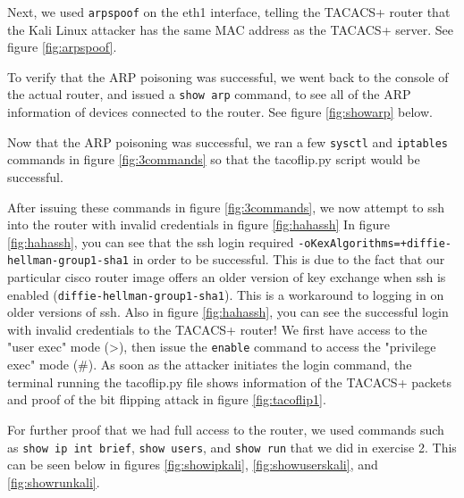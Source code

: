 \documentclass[main.tex]{subfiles}
\begin{document}


Next, we used \texttt{arpspoof} on the eth1 interface, telling the TACACS+ router that the Kali Linux attacker has the same MAC address as the TACACS+ server. See figure \ref{fig:arpspoof}.


To verify that the ARP poisoning was successful, we went back to the console of the actual router, and issued a \texttt{show arp} command, to see all of the ARP information of devices connected to the router. See figure \ref{fig:showarp} below.


Now that the ARP poisoning was successful, we ran a few \texttt{sysctl} and \texttt{iptables} commands in figure \ref{fig:3commands} so that the tacoflip.py script would be successful. 

After issuing these commands in figure \ref{fig:3commands}, we now attempt to ssh into the router with invalid credentials in figure \ref{fig:hahassh}
In figure \ref{fig:hahassh}, you can see that the ssh login required \texttt{-oKexAlgorithms=+diffie-hellman-group1-sha1} in order to be successful. This is due to the fact that our particular cisco router image offers an older version of key exchange when ssh is enabled (\texttt{diffie-hellman-group1-sha1}). This is a workaround to logging in on older versions of ssh.
\hfill \break
Also in figure \ref{fig:hahassh}, you can see the successful login with invalid credentials to the TACACS+ router! We first have access to the "user exec" mode (\textgreater), then issue the \texttt{enable} command to access the "privilege exec" mode (\#). 
\hfill \break
As soon as the attacker initiates the login command, the terminal running the tacoflip.py file shows information of the TACACS+ packets and proof of the bit flipping attack in figure \ref{fig:tacoflip1}. 

For further proof that we had full access to the router, we used commands such as \texttt{show ip int brief}, \texttt{show users}, and \texttt{show run} that we did in exercise 2. This can be seen below in figures \ref{fig:showipkali}, \ref{fig:showuserskali}, and \ref{fig:showrunkali}.
\end{document}

